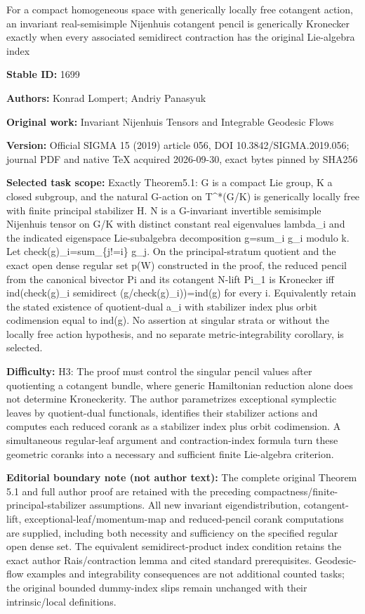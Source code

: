 \documentclass[11pt]{article}
\numberwithin{equation}{section}
\begin{document}
\begin{center}\Large For a compact homogeneous space with generically locally free cotangent action, an invariant real-semisimple Nijenhuis cotangent pencil is generically Kronecker exactly when every associated semidirect contraction has the original Lie-algebra index\end{center}
\noindent\textbf{Stable ID:} 1699\par
\noindent\textbf{Authors:} Konrad Lompert; Andriy Panasyuk\par
\noindent\textbf{Original work:} Invariant Nijenhuis Tensors and Integrable Geodesic Flows\par
\noindent\textbf{Version:} Official SIGMA 15 (2019) article 056, DOI 10.3842/SIGMA.2019.056; journal PDF and native TeX acquired 2026-09-30, exact bytes pinned by SHA256\par
\noindent\textbf{Selected task scope:} Exactly Theorem5.1: G is a compact Lie group, K a closed subgroup, and the natural G-action on T\textasciicircum{}*(G/K) is generically locally free with finite principal stabilizer H. N is a G-invariant invertible semisimple Nijenhuis tensor on G/K with distinct constant real eigenvalues lambda\_i and the indicated eigenspace Lie-subalgebra decomposition g=sum\_i g\_i modulo k. Let check(g)\_i=sum\_\{j!=i\} g\_j. On the principal-stratum quotient and the exact open dense regular set p(W) constructed in the proof, the reduced pencil from the canonical bivector Pi and its cotangent N-lift Pi\_1 is Kronecker iff ind(check(g)\_i semidirect (g/check(g)\_i))=ind(g) for every i. Equivalently retain the stated existence of quotient-dual a\_i with stabilizer index plus orbit codimension equal to ind(g). No assertion at singular strata or without the locally free action hypothesis, and no separate metric-integrability corollary, is selected.\par
\noindent\textbf{Difficulty:} H3: The proof must control the singular pencil values after quotienting a cotangent bundle, where generic Hamiltonian reduction alone does not determine Kroneckerity. The author parametrizes exceptional symplectic leaves by quotient-dual functionals, identifies their stabilizer actions and computes each reduced corank as a stabilizer index plus orbit codimension. A simultaneous regular-leaf argument and contraction-index formula turn these geometric coranks into a necessary and sufficient finite Lie-algebra criterion.\par
\noindent\textbf{Editorial boundary note (not author text):} The complete original Theorem 5.1 and full author proof are retained with the preceding compactness/finite-principal-stabilizer assumptions. All new invariant eigendistribution, cotangent-lift, exceptional-leaf/momentum-map and reduced-pencil corank computations are supplied, including both necessity and sufficiency on the specified regular open dense set. The equivalent semidirect-product index condition retains the exact author Rais/contraction lemma and cited standard prerequisites. Geodesic-flow examples and integrability consequences are not additional counted tasks; the original bounded dummy-index slips remain unchanged with their intrinsic/local definitions.\par
\end{document}
